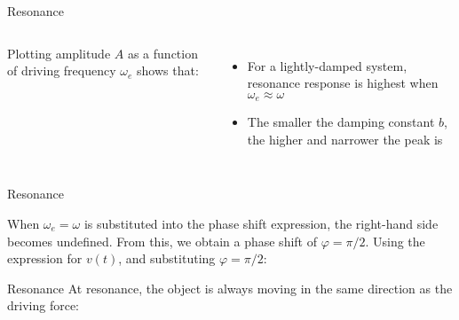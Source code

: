 \documentclass[12pt,compress,aspectratio=169]{beamer}
\begin{document}
\begin{frame}{Resonance}
  \begin{columns}
    
    Plotting amplitude $A$ as a function of driving frequency $\omega_e$ shows
    that:
    \begin{itemize}
    \item For a lightly-damped system, resonance response is highest when
      $\omega_e\approx\omega$
    \item The smaller the damping constant $b$, the higher and narrower the
      peak is
    \end{itemize}
  \end{columns}
\end{frame}



\begin{frame}{Resonance}


  When $\omega_e=\omega$ is substituted into the phase shift expression, the
  right-hand side becomes undefined. From this, we obtain a phase shift of
  $\varphi=\pi/2$. Using the expression for $v(t)$, and substituting
  $\varphi=\pi/2$:
  
\end{frame}



\begin{frame}{Resonance}
  At resonance, the object is always moving in the same direction as the
  driving force:

\end{frame}
\end{document}
